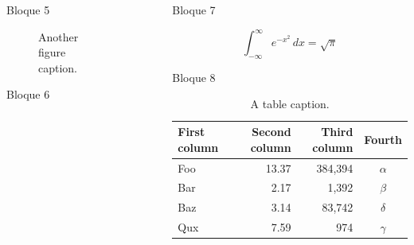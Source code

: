 \documentclass[final]{beamer}
\newlength{\sepwidth}
\newlength{\colwidth}
\newcommand{\separatorcolumn}{\begin{column}{\sepwidth}\end{column}}
\begin{document}
\begin{frame}[t]
\begin{columns}[t]
\begin{column}{\colwidth}
\begin{block}{Bloque 5}
    \begin{figure}
      \centering
      \caption{Another figure caption.}
    \end{figure}

  \end{block}
  \begin{block}{Bloque 6}



  \end{block}

\end{column}

\separatorcolumn

\begin{column}{\colwidth}
  \begin{exampleblock}{Bloque 7}

    $$
    \int_{-\infty}^{\infty} e^{-x^2}\,dx = \sqrt{\pi}
    $$


  \end{exampleblock}
  \begin{block}{Bloque 8}


    \begin{table}
      \centering
      \begin{tabular}{l r r c}
        \toprule
        \textbf{First column} & \textbf{Second column} & \textbf{Third column} & \textbf{Fourth} \\
        \midrule
        Foo & 13.37 & 384,394 & $\alpha$ \\
        Bar & 2.17 & 1,392 & $\beta$ \\
        Baz & 3.14 & 83,742 & $\delta$ \\
        Qux & 7.59 & 974 & $\gamma$ \\
        \bottomrule
      \end{tabular}
      \caption{A table caption.}
    \end{table}


\end{block}
\end{column}
\end{columns}
\end{frame}
\end{document}
